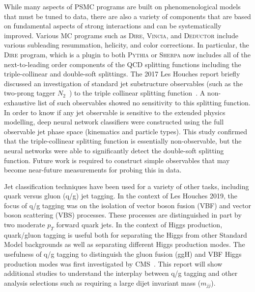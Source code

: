 \documentclass[11pt]{cernrep}
\begin{document}
While many aspects of PSMC programs are built on phenomenological models that must be tuned to data, there are also a variety of components that are based on fundamental aspects of strong interactions and can be systematically improved.  Various MC programs such as \textsc{Dire}, \textsc{Vincia}, and \textsc{Deductor} include various subleading resummation, helicity, and color corrections.  In particular, the \textsc{Dire} program, which is a plugin to both \textsc{Pythia} or \textsc{Sherpa} now includes all of the next-to-leading order components of the QCD splitting functions including the triple-collinear and double-soft splittings.   The 2017 Les Houches report briefly discussed an investigation of standard jet substructure observables (such as the two-prong tagger $N_2$~\cite{Moult:2016cvt}) to the triple collinear splitting function~\cite{Bendavid:2018nar}.  A non-exhaustive list of such observables showed no sensitivity to this splitting function.  In order to know if any jet observable is sensitive to the extended physics modelling, deep neural network classifiers were constructed using the full observable jet phase space (kinematics and particle types).   This study confirmed that the triple-collinear splitting function is essentially non-observable, but the neural networks were able to significantly detect the double-soft splitting function.  Future work is required to construct simple observables that may become near-future measurements for probing this in data.

Jet classification techniques have been used for a variety of other tasks, including quark versus gluon (q/g) jet tagging.  In the context of Les Houches 2019, the focus of q/g tagging was on the isolation of vector boson fusion (VBF) and vector boson scattering (VBS) processes.  These processes are distinguished in part by two moderate $p_T$ forward quark jets.  In the context of Higgs production, quark/gluon tagging is useful both for separating the Higgs from other Standard Model backgrounds as well as separating different Higgs production modes.   The usefulness of q/g tagging to distinguish the gluon fusion (ggH) and VBF Higgs production modes was first investigated by CMS~\cite{Khachatryan:2015bnx}.  This report will show additional studies to understand the interplay between q/g tagging and other analysis selections such as requiring a large dijet invariant mass ($m_{jj}$).
\end{document}
